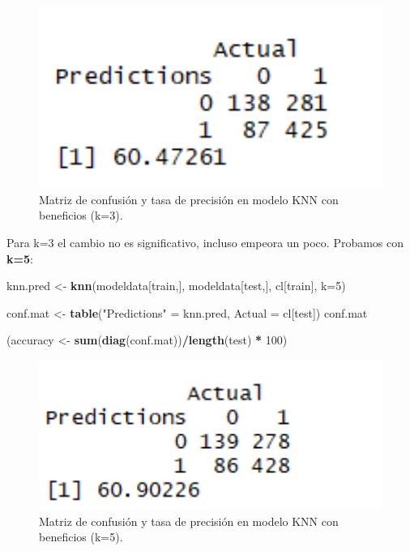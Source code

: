\documentclass[spanish,]{article}
\newenvironment{Shaded}{\begin{snugshade}}{\end{snugshade}}
\newcommand{\KeywordTok}[1]{\textcolor[rgb]{0.13,0.29,0.53}{\textbf{#1}}}
\newcommand{\DataTypeTok}[1]{\textcolor[rgb]{0.13,0.29,0.53}{#1}}
\newcommand{\DecValTok}[1]{\textcolor[rgb]{0.00,0.00,0.81}{#1}}
\newcommand{\StringTok}[1]{\textcolor[rgb]{0.31,0.60,0.02}{#1}}
\newcommand{\OperatorTok}[1]{\textcolor[rgb]{0.81,0.36,0.00}{\textbf{#1}}}
\newcommand{\NormalTok}[1]{#1}
\begin{document}
\begin{figure}[h]
    \centering
    \includegraphics[width=1\textwidth]{figuras/KNN/benefits_k3.png}
    \caption{Matriz de confusión y tasa de precisión en modelo KNN con beneficios (k=3).}
    \label{fig:KNN:benefitsK3}
\end{figure}

Para k=3 el cambio no es significativo, incluso empeora un poco.
Probamos con \textbf{k=5}:

\begin{Shaded}
\begin{Highlighting}[]
\NormalTok{knn.pred <-}\StringTok{ }\KeywordTok{knn}\NormalTok{(modeldata[train,], modeldata[test,], cl[train], }\DataTypeTok{k=}\DecValTok{5}\NormalTok{) }

\NormalTok{conf.mat <-}\StringTok{ }\KeywordTok{table}\NormalTok{(}\StringTok{"Predictions"}\NormalTok{ =}\StringTok{ }\NormalTok{knn.pred, }\DataTypeTok{Actual =}\NormalTok{ cl[test])}
\NormalTok{conf.mat}

\NormalTok{(accuracy <-}\StringTok{ }\KeywordTok{sum}\NormalTok{(}\KeywordTok{diag}\NormalTok{(conf.mat))}\OperatorTok{/}\KeywordTok{length}\NormalTok{(test) }\OperatorTok{*}\StringTok{ }\DecValTok{100}\NormalTok{)}
\end{Highlighting}
\end{Shaded}

\begin{figure}[h]
    \centering
    \includegraphics[width=1\textwidth]{figuras/KNN/benefits_k5.png}
    \caption{Matriz de confusión y tasa de precisión en modelo KNN con beneficios (k=5).}
    \label{fig:KNN:benefitsK5}
\end{figure}
\end{document}
